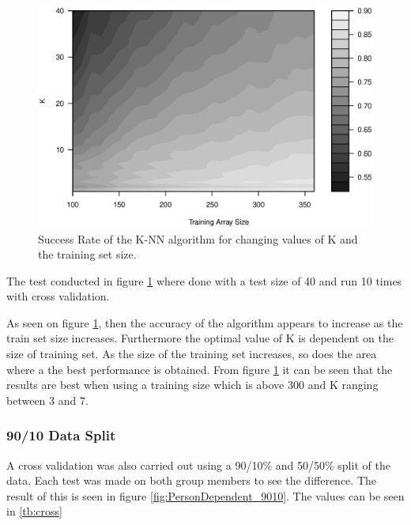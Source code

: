 
\begin{figure}[H]
\centering
\includegraphics[width = 13cm]{graphics/graph_G3M2_10_10}
\caption{Success Rate of the K-NN algorithm for changing values of K and the training set size.}
\label{fig:personDependent_contour}
\end{figure}


The test conducted in figure \ref{fig:personDependent_contour} where done with a test size of 40 and run 10 times with cross validation.

As seen on figure \ref{fig:personDependent_contour}, then the accuracy of the algorithm appears to increase as the train set size increases.
Furthermore the optimal value of K is dependent on the size of training set. 
As the size of the training set increases, so does the area where a the best performance is obtained.
From figure \ref{fig:personDependent_contour} it can be seen that the results are best when using a training size which is above 300 and K ranging between 3 and 7.


\subsubsection{90/10 Data Split}
A cross validation was also carried out using a 90/10\% and 50/50\% split of the data. 
Each test was made on both group members to see the difference.
The result of this is seen in figure \ref{fig:PersonDependent_9010}.
The values can be seen in \ref{tb:cross}

